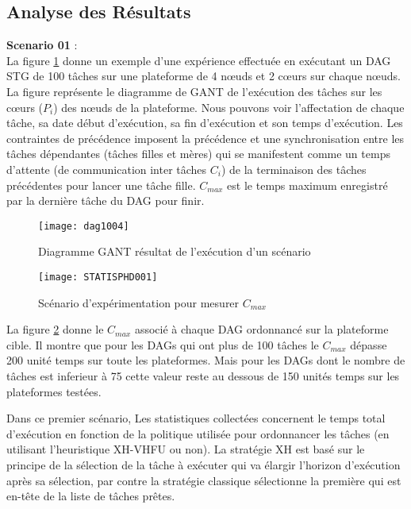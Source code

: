 \subsection{Analyse des Résultats}
%
\textbf{Scenario 01} :\\
%
La figure \ref{fig:fig100400x} donne un exemple d'une expérience effectuée en exécutant un DAG STG de 100 tâches sur une plateforme de 4 nœuds et 2 cœurs sur chaque nœuds. La figure représente le diagramme de GANT de l'exécution des tâches sur les cœurs ($P_i$) des nœuds de la plateforme. Nous pouvons voir l'affectation de chaque tâche, sa date début d'exécution, sa fin d'exécution et son temps d'exécution. Les contraintes de précédence imposent la précédence et une synchronisation entre les tâches dépendantes (tâches filles et mères) qui se manifestent comme un temps d'attente (de communication inter tâches $C_i$) de la terminaison des tâches précédentes pour lancer une tâche fille. $C_{max}$ est le temps maximum enregistré par la dernière tâche du DAG pour finir.
%
\begin{figure}[h!]
\texttt{[image: dag1004]}
\centering
\caption{Diagramme GANT résultat de l'exécution d'un scénario}
\label{fig:fig100400x}
\end{figure}
%
%
\begin{figure}[h!]
\texttt{[image: STATISPHD001]}
\centering
\caption{Scénario d'expérimentation pour mesurer $C_{max}$}
\label{fig:fg10200x}
\end{figure}
%
La figure \ref{fig:fg10200x} donne le $C_{max}$ associé à chaque DAG ordonnancé sur la plateforme cible. Il montre que pour les DAGs qui ont plus de 100 tâches le $C_{max}$ dépasse 200 unité temps sur toute les plateformes. Mais pour les DAGs dont le nombre de tâches est inferieur à 75 cette valeur reste au dessous de 150 unités temps sur les plateformes testées.

Dans ce premier scénario, Les statistiques collectées concernent le temps total d'exécution en fonction de la politique utilisée pour ordonnancer les tâches (en utilisant l'heuristique XH-VHFU ou non). La stratégie XH est basé sur le principe de la sélection de la tâche à exécuter qui va élargir l'horizon d'exécution après sa sélection, par contre la stratégie classique sélectionne la première qui est en-tête de la liste de tâches prêtes.


